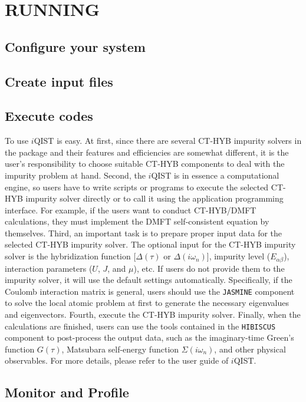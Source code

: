 \chapter{RUNNING}
\section{Configure your system}
\section{Create input files}
\section{Execute codes}

To use $i$QIST is easy. At first, since there are several CT-HYB impurity solvers in the package and their features and efficiencies are somewhat different, it is the user's responsibility to choose suitable CT-HYB components to deal with the impurity problem at hand. Second, the $i$QIST is in essence a computational engine, so users have to write scripts or programs to execute the selected CT-HYB impurity solver directly or to call it using the application programming interface. For example, if the users want to conduct CT-HYB/DMFT calculations, they must implement the DMFT self-consistent equation by themselves. Third, an important task is to prepare proper input data for the selected CT-HYB impurity solver. The optional input for the CT-HYB impurity solver is the hybridization function [$\Delta(\tau)$ or $\Delta(i\omega_n)$], impurity level ($E_{\alpha\beta}$), interaction parameters ($U$, $J$, and $\mu$), etc. If users do not provide them to the impurity solver, it will use the default settings automatically. Specifically, if the Coulomb interaction matrix is general, users should use the \texttt{JASMINE} component to solve the local atomic problem at first to generate the necessary eigenvalues and eigenvectors. Fourth, execute the CT-HYB impurity solver. Finally, when the calculations are finished, users can use the tools contained in the \texttt{HIBISCUS} component to post-process the output data, such as the imaginary-time Green's function $G(\tau)$, Matsubara self-energy function $\Sigma(i\omega_n)$, and other physical observables. For more details, please refer to the user guide of $i$QIST.

\section{Monitor and Profile}
